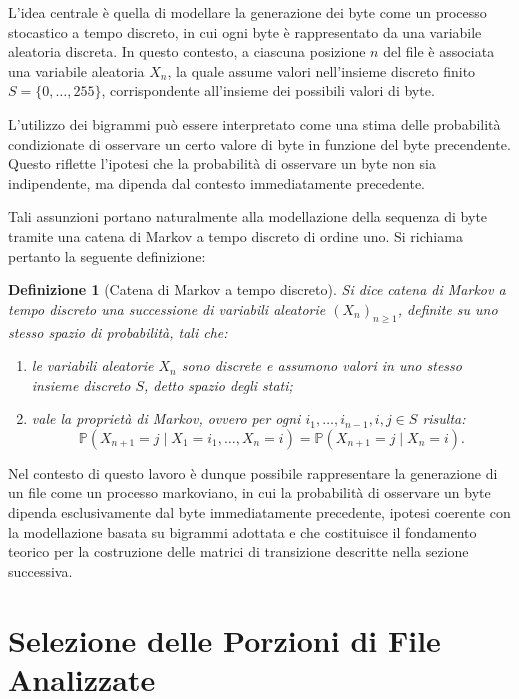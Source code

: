\documentclass{report}
\newtheorem{definition}{Definizione}[chapter]
\begin{document}
\bigskip

L'idea centrale è quella di modellare la generazione dei byte come un processo stocastico a tempo discreto,
in cui ogni byte è rappresentato da una variabile aleatoria discreta.
In questo contesto, a ciascuna posizione \(n\) del file è associata una variabile aleatoria \(X_n\),
la quale assume valori nell'insieme discreto finito \(S = \{0, \dots, 255\}\),
corrispondente all’insieme dei possibili valori di byte.

\bigskip

L'utilizzo dei bigrammi può essere interpretato come una stima delle probabilità condizionate di osservare un certo 
valore di byte in funzione del byte precendente. Questo riflette l'ipotesi che la probabilità di osservare 
un byte non sia indipendente, ma dipenda dal contesto immediatamente precedente.

\bigskip

Tali assunzioni portano naturalmente alla modellazione della sequenza di byte tramite una catena di Markov 
a tempo discreto di ordine uno.
Si richiama pertanto la seguente definizione:

\begin{definition}[Catena di Markov a tempo discreto]
Si dice catena di Markov a tempo discreto una successione di variabili aleatorie
$(X_n)_{n \geq 1}$, definite su uno stesso spazio di probabilità, tali che:
\begin{enumerate}
    \item le variabili aleatorie $X_n$ sono discrete e assumono valori in uno stesso
    insieme discreto $S$, detto spazio degli stati;
    \item vale la proprietà di Markov, ovvero per ogni $i_1, \dots, i_{n-1}, i, j \in S$
    risulta:
    \[
    \mathbb{P}(X_{n+1} = j \mid X_1 = i_1, \dots, X_n = i)
    =
    \mathbb{P}(X_{n+1} = j \mid X_n = i).
    \]
\end{enumerate}
\end{definition}

\bigskip

Nel contesto di questo lavoro è dunque possibile rappresentare la generazione di un file come un 
processo markoviano, in cui la probabilità di osservare un byte
dipenda esclusivamente dal byte immediatamente precedente, ipotesi coerente con la modellazione
basata su bigrammi adottata e che costituisce il fondamento teorico per la costruzione delle
matrici di transizione descritte nella sezione successiva.


\section{Selezione delle Porzioni di File Analizzate}
\end{document}
